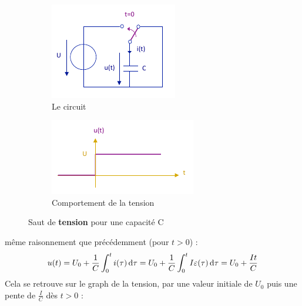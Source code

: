 \documentclass[12pt,a4paper]{article}
\begin{document}
\begin{figure}[!h]
	\centering
	\begin{subfigure}[b]{0.45\textwidth}
		\centering
		\includegraphics[scale=0.75]{images/saut_tension_C}
		\caption{Le circuit}
	\end{subfigure}
	\begin{subfigure}[b]{0.45\textwidth}
		\centering
		\includegraphics[scale=0.65]{images/fonction1_saut_tension_C}
		\caption{Comportement de la tension}
	\end{subfigure}
	\caption{Saut de \textbf{tension} pour une capacité C}
\end{figure}
\newpage
{} même raisonnement que précédemment (pour $t > 0$) :
\[u(t) = U_0 + \frac{1}{C} \int_0^t i(\tau)\, \mathrm d \tau = U_0 + \frac{1}{C}\int_0^tI\varepsilon(\tau)\, \mathrm d \tau = U_0 + \frac{It}{C}\]
Cela se retrouve sur le graph de la tension, par une valeur initiale de $U_0$ puis une pente de $\frac{I}{C}$ dès $t>0$ :
\end{document}
